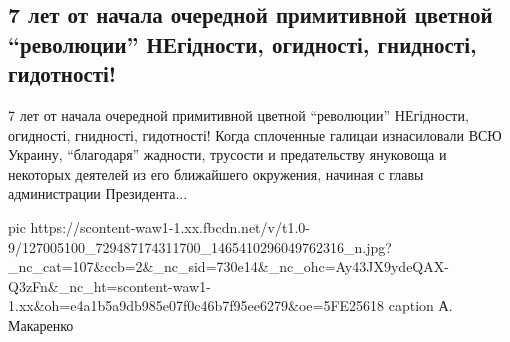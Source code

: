  
 
 
 
 
 
\subsection{7 лет от начала очередной примитивной цветной \enquote{революции} НЕгідности, огидності, гнидності, гидотності!}
\label{sec:21_11_2020.fb.homichuk_oleksandr.1.revolucia}

7 лет от начала очередной примитивной цветной \enquote{революции} НЕгідности,
огидності, гнидності, гидотності! Когда сплоченные галицаи изнасиловали ВСЮ
Украину, \enquote{благодаря} жадности, трусости и предательству януковоща и некоторых
деятелей из его ближайшего окружения, начиная с главы администрации
Президента...

\ifcmt
pic https://scontent-waw1-1.xx.fbcdn.net/v/t1.0-9/127005100_729487174311700_1465410296049762316_n.jpg?_nc_cat=107&ccb=2&_nc_sid=730e14&_nc_ohc=Ay43JX9ydeQAX-Q3zFn&_nc_ht=scontent-waw1-1.xx&oh=e4a1b5a9db985e07f0c46b7f95ee6279&oe=5FE25618
caption А. Макаренко
\fi
